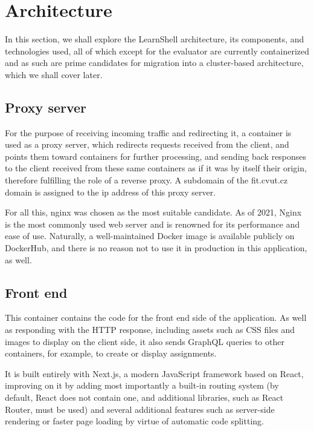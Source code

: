 \documentclass[thesis=B,english]{FITthesis}[2019/12/23]
\begin{document}
\section{Architecture}

In this section, we shall explore the LearnShell architecture, its components, and technologies used, all of which except for the evaluator are currently containerized and as such are prime candidates for migration into a cluster-based architecture, which we shall cover later.

\subsection{Proxy server}

For the purpose of receiving incoming traffic and redirecting it, a container is used as a proxy server, which redirects requests received from the client, and points them toward containers for further processing, and sending back responses to the client received from these same containers as if it was by itself their origin, therefore fulfilling the role of a reverse proxy. \cite{proxies} A subdomain of the fit.cvut.cz domain is assigned to the ip address of this proxy server.

For all this, nginx was chosen as the most suitable candidate. As of 2021, Nginx is the most commonly used web server and is renowned for its performance and ease of use. \cite{netcraft} Naturally, a well-maintained Docker image is available publicly on DockerHub, and there is no reason not to use it in production in this application, as well.

\subsection{Front end}

This container contains the code for the front end side of the application. As well as responding with the HTTP response, including assets such as CSS files and images to display on the client side, it also sends GraphQL queries to other containers, for example, to create or display assignments. 

It is built entirely with Next.js, a modern JavaScript framework based on React, improving on it by adding most importantly a built-in routing system (by default, React does not contain one, and additional libraries, such as React Router, must be used) and several additional features such as server-side rendering or faster page loading by virtue of automatic code splitting.
\end{document}
